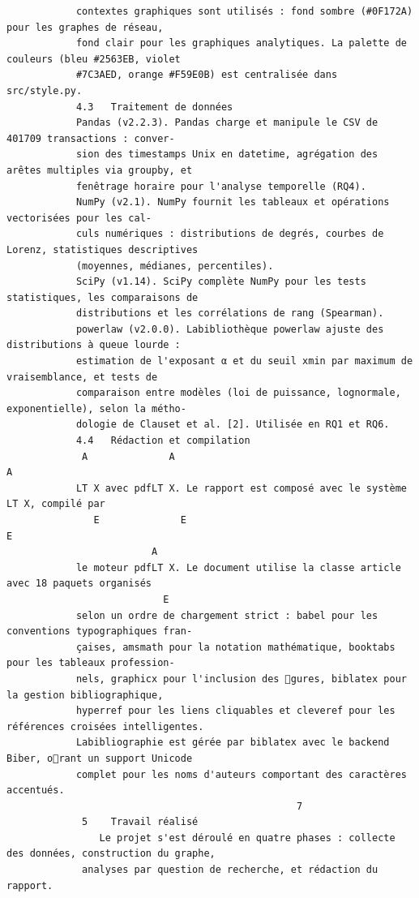 \documentclass[12pt]{article}
\begin{document}
\begin{verbatim}
            contextes graphiques sont utilisés : fond sombre (#0F172A) pour les graphes de réseau,
            fond clair pour les graphiques analytiques. La palette de couleurs (bleu #2563EB, violet
            #7C3AED, orange #F59E0B) est centralisée dans src/style.py.
            4.3   Traitement de données
            Pandas (v2.2.3). Pandas charge et manipule le CSV de 401709 transactions : conver-
            sion des timestamps Unix en datetime, agrégation des arêtes multiples via groupby, et
            fenêtrage horaire pour l'analyse temporelle (RQ4).
            NumPy (v2.1). NumPy fournit les tableaux et opérations vectorisées pour les cal-
            culs numériques : distributions de degrés, courbes de Lorenz, statistiques descriptives
            (moyennes, médianes, percentiles).
            SciPy (v1.14). SciPy complète NumPy pour les tests statistiques, les comparaisons de
            distributions et les corrélations de rang (Spearman).
            powerlaw (v2.0.0). Labibliothèque powerlaw ajuste des distributions à queue lourde :
            estimation de l'exposant α et du seuil xmin par maximum de vraisemblance, et tests de
            comparaison entre modèles (loi de puissance, lognormale, exponentielle), selon la métho-
            dologie de Clauset et al. [2]. Utilisée en RQ1 et RQ6.
            4.4   Rédaction et compilation
             A              A                                           A
            LT X avec pdfLT X. Le rapport est composé avec le système LT X, compilé par
               E              E                                           E
                         A
            le moteur pdfLT X. Le document utilise la classe article avec 18 paquets organisés
                           E
            selon un ordre de chargement strict : babel pour les conventions typographiques fran-
            çaises, amsmath pour la notation mathématique, booktabs pour les tableaux profession-
            nels, graphicx pour l'inclusion des gures, biblatex pour la gestion bibliographique,
            hyperref pour les liens cliquables et cleveref pour les références croisées intelligentes.
            Labibliographie est gérée par biblatex avec le backend Biber, orant un support Unicode
            complet pour les noms d'auteurs comportant des caractères accentués.
                                                  7
             5    Travail réalisé
                Le projet s'est déroulé en quatre phases : collecte des données, construction du graphe,
             analyses par question de recherche, et rédaction du rapport.

\end{verbatim}
\end{document}
